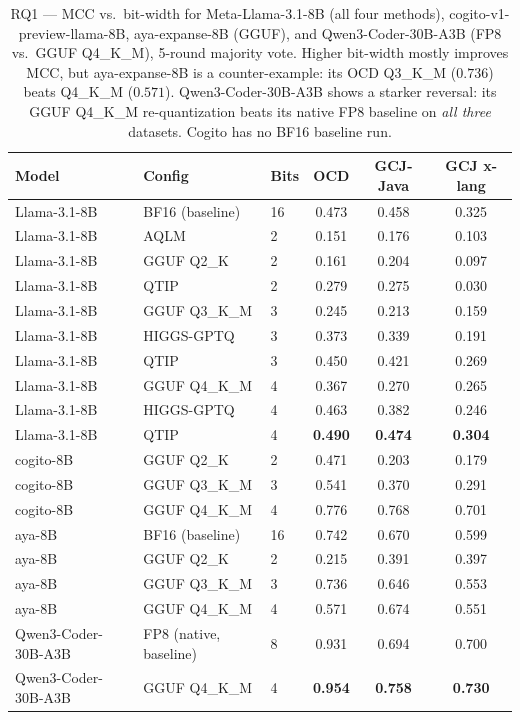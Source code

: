 \documentclass[11pt]{article}
\newcommand{\best}[1]{\textbf{#1}}
\begin{document}
\begin{table}[htbp]
  \centering
  \caption{RQ1 --- MCC vs.\ bit-width for Meta-Llama-3.1-8B (all four methods),
           cogito-v1-preview-llama-8B, aya-expanse-8B (GGUF), and
           Qwen3-Coder-30B-A3B (FP8 vs.\ GGUF Q4\_K\_M), 5-round
           majority vote. Higher bit-width mostly improves MCC, but
           aya-expanse-8B is a counter-example: its OCD Q3\_K\_M ($0.736$)
           beats Q4\_K\_M ($0.571$). Qwen3-Coder-30B-A3B shows a starker
           reversal: its GGUF Q4\_K\_M re-quantization beats its native FP8
           baseline on \emph{all three} datasets. Cogito has no BF16 baseline
           run.}
  \label{tab:rq1}
  \small
  \begin{tabular}{lllccc}
    \toprule
    \textbf{Model} & \textbf{Config} & \textbf{Bits} & \textbf{OCD} & \textbf{GCJ-Java} & \textbf{GCJ x-lang} \\
    \midrule
    Llama-3.1-8B & BF16 (baseline)      & 16 & 0.473 & 0.458 & 0.325 \\
    \midrule
    Llama-3.1-8B & AQLM                 & 2  & 0.151 & 0.176 & 0.103 \\
    Llama-3.1-8B & GGUF Q2\_K           & 2  & 0.161 & 0.204 & 0.097 \\
    Llama-3.1-8B & QTIP                 & 2  & 0.279 & 0.275 & 0.030 \\
    \midrule
    Llama-3.1-8B & GGUF Q3\_K\_M        & 3  & 0.245 & 0.213 & 0.159 \\
    Llama-3.1-8B & HIGGS-GPTQ           & 3  & 0.373 & 0.339 & 0.191 \\
    Llama-3.1-8B & QTIP                 & 3  & 0.450 & 0.421 & 0.269 \\
    \midrule
    Llama-3.1-8B & GGUF Q4\_K\_M        & 4  & 0.367 & 0.270 & 0.265 \\
    Llama-3.1-8B & HIGGS-GPTQ           & 4  & 0.463 & 0.382 & 0.246 \\
    Llama-3.1-8B & QTIP                 & 4  & \best{0.490} & \best{0.474} & \best{0.304} \\
    \midrule
    cogito-8B    & GGUF Q2\_K           & 2  & 0.471 & 0.203 & 0.179 \\
    cogito-8B    & GGUF Q3\_K\_M        & 3  & 0.541 & 0.370 & 0.291 \\
    cogito-8B    & GGUF Q4\_K\_M        & 4  & 0.776 & 0.768 & 0.701 \\
    \midrule
    aya-8B       & BF16 (baseline)      & 16 & 0.742 & 0.670 & 0.599 \\
    \midrule
    aya-8B       & GGUF Q2\_K           & 2  & 0.215 & 0.391 & 0.397 \\
    aya-8B       & GGUF Q3\_K\_M        & 3  & 0.736 & 0.646 & 0.553 \\
    aya-8B       & GGUF Q4\_K\_M        & 4  & 0.571 & 0.674 & 0.551 \\
    \midrule
    Qwen3-Coder-30B-A3B & FP8 (native, baseline) & 8 & 0.931 & 0.694 & 0.700 \\
    Qwen3-Coder-30B-A3B & GGUF Q4\_K\_M          & 4 & \best{0.954} & \best{0.758} & \best{0.730} \\
    \bottomrule
  \end{tabular}
\end{table}
\end{document}
